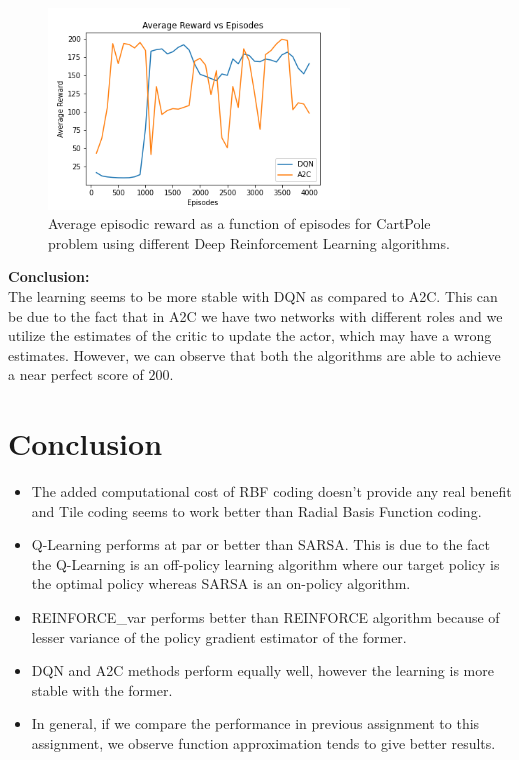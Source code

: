 \documentclass{article}
\begin{document}
    \begin{figure}[H]
        \graphicspath{ {../Experiments/Linear_Function_Approximation/} }
        \begin{center}
        \includegraphics[width=8cm]{Cartpole_deeprl.png}
        \end{center}
        \caption{Average episodic reward as a function of episodes for CartPole problem using different Deep Reinforcement Learning algorithms.}
        \label{cartpole_deeprl}
    \end{figure}

    \noindent %
    \textbf{Conclusion:} \\
    The learning seems to be more stable with DQN as compared to A2C. This can be due to the fact that in A2C we have two networks with different
    roles and we utilize the estimates of the critic to update the actor, which may have a wrong estimates. However, we can observe that both the algorithms are 
    able to achieve a near perfect score of $200$.
    
\section{Conclusion}
\begin{itemize}
\item The added computational cost of RBF coding doesn't provide any real benefit and Tile coding seems to work better than Radial Basis Function coding.
\item Q-Learning performs at par or better than SARSA. This is due to the fact the Q-Learning is an off-policy learning algorithm where our target policy
is the optimal policy whereas SARSA is an on-policy algorithm.
\item REINFORCE\_var performs better than REINFORCE algorithm because of lesser variance of the policy gradient estimator of the former.
\item DQN and A2C methods perform equally well, however the learning is more stable with the former.
\item In general, if we compare the performance in previous assignment to this assignment, we observe function approximation tends to give better results. 
\end{itemize}
\end{document}
